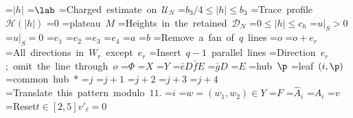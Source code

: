 \documentclass[10pt]{article}
\begin{document}
=\hbox{$|h|$}
=\hbox{$\lab$}
=\hbox{Charged estimate on $\mathcal U_N$}
=\hbox{$b_3/4\leq |h|\leq b_3$}
=\hbox{Trace profile $\mathcal H(|h|)$}
=\hbox{$0$}
=\hbox{plateau $M$}
=\hbox{Heights in the retained $\mathcal D_N$}
=\hbox{$0\leq |h|\leq c_h$}
=\hbox{$u|_S>0$}
=\hbox{$u|_S=0$}
=\hbox{$e_1$}
=\hbox{$e_2$}
=\hbox{$e_3$}
=\hbox{$e_4$}
=\hbox{$a$}
=\hbox{$b$}
=\hbox{Remove a fan of $q$ lines}
=\hbox{$o$}
=\hbox{$o+e_r$}
=\hbox{All directions in $W_r$ except $e_r$}
=\hbox{Insert $q-1$ parallel lines}
=\hbox{Direction $e_r$; omit the line through $o$}
=\hbox{$\Phi$}
=\hbox{$X$}
=\hbox{$Y$}
=\hbox{$\bar eD\bar fE$}
=\hbox{$\bar gD$}
=\hbox{$E$}
=\hbox{hub $\p$}
=\hbox{leaf $(i,\p)$}
=\hbox{common hub $*$}
=\hbox{$j$}
=\hbox{$j+1$}
=\hbox{$j+2$}
=\hbox{$j+3$}
=\hbox{$j+4$}
=\hbox{Translate this pattern modulo $11$.}
=\hbox{$i$}
=\hbox{$w=(w_1,w_2)\in Y$}
=\hbox{$F$}
=\hbox{$\widehat A_i$}
=\hbox{$A_i$}
=\hbox{$v$}
=\hbox{Reset\\\(t\in[2,5]\)\\\(v'_\ell=0\)}
\end{document}
